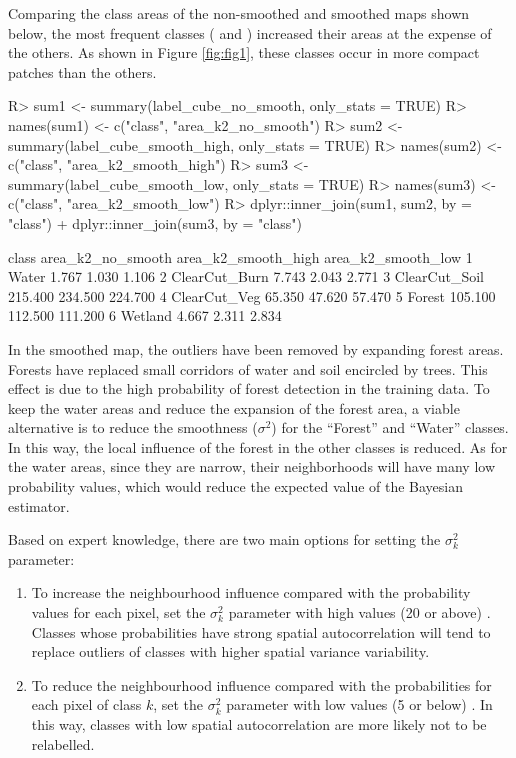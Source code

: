 \documentclass[
]{jss}
\begin{document}
Comparing the class areas of the non-smoothed and smoothed maps shown below, the most frequent classes ( and ) increased their areas at the expense of the others. As shown in Figure \ref{fig:fig1}, these classes occur in more compact patches than the others.

\begin{CodeChunk}
\begin{CodeInput}
R> sum1 <- summary(label_cube_no_smooth, only_stats = TRUE)
R> names(sum1) <- c("class", "area_k2_no_smooth")
R> sum2 <- summary(label_cube_smooth_high, only_stats = TRUE)
R> names(sum2) <- c("class", "area_k2_smooth_high")
R> sum3 <- summary(label_cube_smooth_low, only_stats = TRUE)
R> names(sum3) <- c("class", "area_k2_smooth_low")
R> dplyr::inner_join(sum1, sum2, by = "class") %
+   dplyr::inner_join(sum3, by = "class")
\end{CodeInput}
\begin{CodeOutput}
          class area_k2_no_smooth area_k2_smooth_high area_k2_smooth_low
1         Water             1.767               1.030              1.106
2 ClearCut_Burn             7.743               2.043              2.771
3 ClearCut_Soil           215.400             234.500            224.700
4  ClearCut_Veg            65.350              47.620             57.470
5        Forest           105.100             112.500            111.200
6       Wetland             4.667               2.311              2.834
\end{CodeOutput}
\end{CodeChunk}

In the smoothed map, the outliers have been removed by expanding forest areas. Forests have replaced small corridors of water and soil encircled by trees. This effect is due to the high probability of forest detection in the training data. To keep the water areas and reduce the expansion of the forest area, a viable alternative is to reduce the smoothness (\(\sigma^2\)) for the ``Forest'' and ``Water'' classes. In this way, the local influence of the forest in the other classes is reduced. As for the water areas, since they are narrow, their neighborhoods will have many low probability values, which would reduce the expected value of the Bayesian estimator.

Based on expert knowledge, there are two main options for setting the \(\sigma^2_{k}\) parameter:

\begin{enumerate}
\def\labelenumi{\arabic{enumi}.}
\item
  To increase the neighbourhood influence compared with the probability values for each pixel, set the \(\sigma^2_{k}\) parameter with high values (20 or above) . Classes whose probabilities have strong spatial autocorrelation will tend to replace outliers of classes with higher spatial variance variability.
\item
  To reduce the neighbourhood influence compared with the probabilities for each pixel of class \(k\), set the \(\sigma^2_{k}\) parameter with low values (5 or below) . In this way, classes with low spatial autocorrelation are more likely not to be relabelled.
\end{enumerate}
\end{document}
